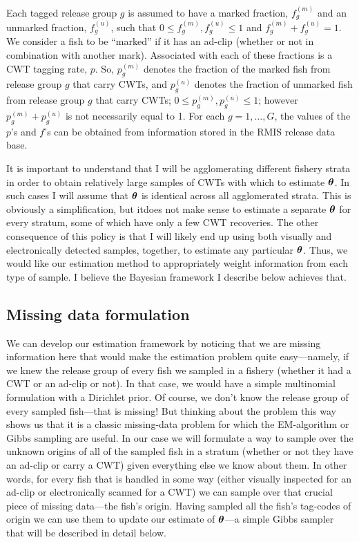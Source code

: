 \documentclass[11pt]{article}
\def\bm#1{\mathpalette\bmstyle{#1}}
\def\bmstyle#1#2{\mbox{\boldmath$#1#2$}}
\newcommand{\btheta}{\bm{\theta}}
\begin{document}
Each tagged release group $g$ is assumed to have a marked fraction, $f^{(m)}_g$ and an unmarked fraction, $f^{(u)}_g$, 
such that $0 \leq f^{(m)}_g, f^{(u)}_g \leq 1$ and $f^{(m)}_g + f^{(u)}_g = 1$.  We consider a fish to be ``marked'' if it has an ad-clip (whether or
not in combination with another mark).   Associated with each of these fractions is a CWT tagging rate, $p$.  So, $p^{(m)}_g$ denotes the
fraction of the marked fish from release group $g$ that carry CWTs, and $p^{(u)}_g$ denotes the fraction
of unmarked fish from release group $g$ that carry CWTs; $0 \leq p^{(m)}_g, p^{(u)}_g \leq 1$;
however $p^{(m)}_g + p^{(u)}_g$ is not necessarily equal to 1.  For each $g=1,\ldots,G$, the values of the $p$'s and $f$'s can be obtained
from information stored in the RMIS release data base.


It is important to understand that I will be agglomerating different fishery strata in order to obtain
relatively large samples of CWTs with which to estimate $\btheta$.  In such cases I will assume that
$\btheta$ is identical across all agglomerated strata.  This is obviously a simplification, but itdoes not make 
sense to estimate a separate $\btheta$ for every stratum, some of which have only a few CWT recoveries.
The other consequence
of this policy is that I will likely end up using both visually and electronically detected samples, together, to 
estimate any particular $\btheta$.  Thus, we would like our estimation method to
appropriately weight information from each type of sample.  I believe the Bayesian framework I
describe below achieves that.

\subsection{Missing data formulation}
We can develop our estimation framework by noticing that we are missing information here
that would make the estimation problem quite easy---namely, if we knew the release group of every
fish we sampled in a fishery (whether it had a CWT or an ad-clip or not).  In that case, we would have a simple multinomial
formulation with a Dirichlet prior.  Of course, we don't know the release group of every sampled
fish---that is missing!  But thinking about the problem this way shows us that it is a classic
missing-data problem for which the EM-algorithm or Gibbs sampling are useful.  In our case we will
formulate a way to sample over the unknown origins of all of the sampled fish in a stratum (whether or 
not they have an ad-clip or carry a CWT) given 
everything else we know about them.
In other words, for every fish that is handled in some way (either visually inspected for an ad-clip or
electronically scanned for a CWT) we can sample over that crucial piece of missing data---the fish's origin.
Having sampled all the fish's tag-codes of origin we can use them to update our estimate of
$\btheta$---a simple Gibbs sampler that will be described in detail below.
\end{document}
